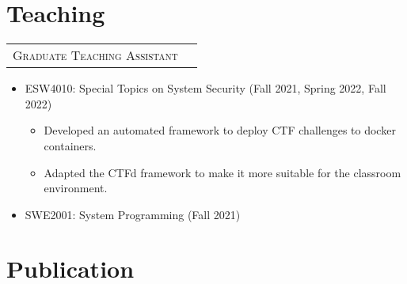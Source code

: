\documentclass[a4paper,12pt]{article}
\begin{document}
\section{Teaching}
\begin{tabularx}{\linewidth}{@{}lX@{}}	
\textsc{Graduate Teaching Assistant} \\

\end{tabularx}
\begin{itemize}
    \item ESW4010: Special Topics on System Security (Fall 2021, Spring 2022, Fall 2022)
    \begin{itemize}
        \item Developed an automated framework to deploy CTF challenges to docker containers.
        \item Adapted the CTFd framework to make it more suitable for the classroom environment.
    \end{itemize}
    \item SWE2001: System Programming (Fall 2021)
\end{itemize}





\section{Publication}
\begin{refsection}
\nocite{*}
\printbibliography[heading=none]
\end{refsection}
\vfill
{}
\end{document}

